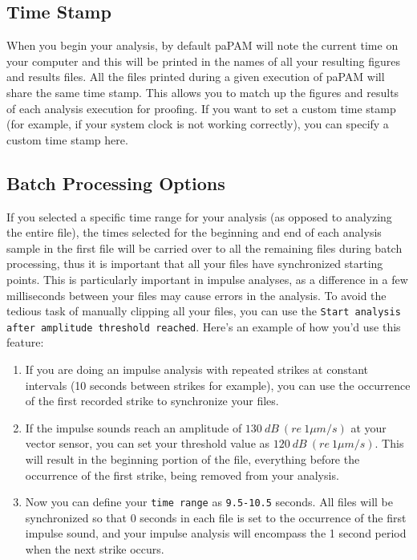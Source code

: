 \documentclass[11pt]{report}
\begin{document}
\subsection{Time Stamp}

When you begin your analysis, by default paPAM will note the current time on your computer and this will be printed in the names of all your resulting figures and results files.  All the files printed during a given execution of paPAM will share the same time stamp.  This allows you to match up the figures and results of each analysis execution for proofing.  If you want to set a custom time stamp (for example, if your system clock is not working correctly), you can specify a custom time stamp here.

\subsection{Batch Processing Options} \label{BatchProcessingOptions}
If you selected a specific time range for your analysis (as opposed to analyzing the entire file), the times selected for the beginning and end of each analysis sample in the first file will be carried over to all the remaining files during batch processing, thus it is important that all your files have synchronized starting points.  This is particularly important in impulse analyses, as a difference in a few milliseconds between your files may cause errors in the analysis.
To avoid the tedious task of manually clipping all your files, you can use the \texttt{Start analysis after amplitude threshold reached}.  Here's an example of how you'd use this feature:
\begin{enumerate}
\item If you are doing an impulse analysis with repeated strikes at constant intervals (10 seconds between strikes for example), you can use the occurrence of the first recorded strike to synchronize your files.
\item If the impulse sounds reach an amplitude of $130\ dB\ (re\ 1 \mu m/s)$ at your vector sensor, you can set your threshold value as $120\ dB\ (re\ 1 \mu m/s)$.  This will result in the beginning portion of the file, everything before the occurrence of the first strike, being removed from your analysis.
\item Now you can define your \texttt{time range} as \texttt{9.5-10.5} seconds.  All files will be synchronized so that 0 seconds in each file is set to the occurrence of the first impulse sound, and your impulse analysis will encompass the 1 second period when the next strike occurs.
\end{enumerate}
\end{document}
